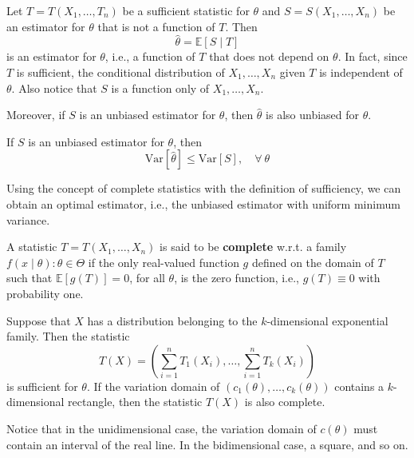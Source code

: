 \documentclass[12pt,a4paper]{report}
\begin{document}
Let $T = T(X_1, \ldots, T_n)$ be a sufficient statistic for $\theta$ and $S = S(X_1, \ldots, X_n)$ be an estimator for $\theta$ that is not a function of $T$. Then 
\begin{equation}\label{eq:202301201116}
    \hat{\theta} = \mathbb{E}[S \mid T]
\end{equation}
is an estimator for $\theta$, i.e., a function of $T$ that does not depend on $\theta$. In fact, since $T$ is sufficient, the conditional distribution of $X_1, \ldots, X_n$ given $T$ is independent of $\theta$. Also notice that $S$ is a function only of $X_1,\ldots, X_n$.

Moreover, if $S$ is an unbiased estimator for $\theta$, then $\hat{\theta}$ is also unbiased for $\theta$. 

\begin{theorem}\label{eq:202301201117}
    If $S$ is an unbiased estimator for $\theta$, then 
    \begin{equation}
        \text{Var}[\hat{\theta}] \leq \text{Var}[S], \quad \forall ~\theta
    \end{equation}
\end{theorem}

Using the concept of complete statistics with the definition of sufficiency, we can obtain an optimal estimator, i.e., the unbiased estimator with uniform minimum variance.

\begin{definition}
    A statistic $T = T(X_1, \ldots, X_n)$ is said to be \textbf{complete} w.r.t. a family $f(x \mid \theta) : \theta \in \Theta$ if the only real-valued function $g$ defined on the domain of $T$ such that $\mathbb{E}[g(T)] = 0$, for all $\theta$, is the zero function, i.e., $g(T) \equiv 0$ with probability one.
\end{definition}

\begin{theorem}
    Suppose that $X$ has a distribution belonging to the $k$-dimensional exponential family. Then the statistic 
    \[
        T(X) = \left( \sum_{i=1}^{n} T_1(X_i), \ldots, \sum_{i=1}^{n} T_k(X_i) \right)
    \]
    is sufficient for $\theta$. If the variation domain of $(c_1(\theta), \ldots, c_k(\theta))$ contains a $k$-dimensional rectangle, then the statistic $T(X)$ is also complete.
\end{theorem}

Notice that in the unidimensional case, the variation domain of $c(\theta)$ must contain an interval of the real line. In the bidimensional case, a square, and so on. 
\end{document}
